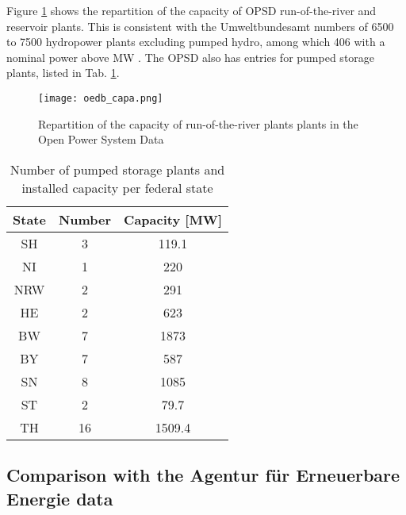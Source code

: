 Figure \ref{oedb_capa} shows the repartition of the capacity of OPSD run-of-the-river and reservoir plants. This is consistent with the Umweltbundesamt numbers of 6500 to 7500 hydropower plants excluding pumped hydro, among which 406 with a nominal power above \unit[1]{MW} \cite{uba_wasserkraft}. The OPSD also has entries for pumped storage plants, listed in Tab. \ref{oedb_pump}.

\begin{figure}[H]
\centering
\texttt{[image: oedb\_capa.png]}
\caption[Repartition of the capacity of run-of-the-river and reservoir plants in the Open Power System Data]{Repartition of the capacity of run-of-the-river plants plants in the Open Power System Data}
\label{oedb_capa}
\end{figure}

\begin{table} [H]
\footnotesize
  \centering
  \caption[Number of pumped storage plants and installed capacity per federal state]{Number of pumped storage plants and installed capacity per federal state \cite{oedb}}
  \label{oedb_pump}
  \begin{tabular}{|c|cc| }
  \hline
  \textbf{State} & Number 	& 	Capacity [\unit{MW}] 	\\
  \hline
  SH	&	3	&	119.1	\\
  NI	&	1	&	220	\\
  NRW	&	2	&	291	\\
  HE	&	2	&	623	\\
  BW	&	7	&	1873	\\	
  BY	&	7	&	587	\\
  SN	&	8	&	1085	\\
  ST	&	2	&	79.7	\\
  TH	&	16	&	1509.4	\\
  \hline
  \end{tabular}
\end{table}

\subsection{Comparison with the Agentur für Erneuerbare Energie data}
\label{sub:prod_data}


